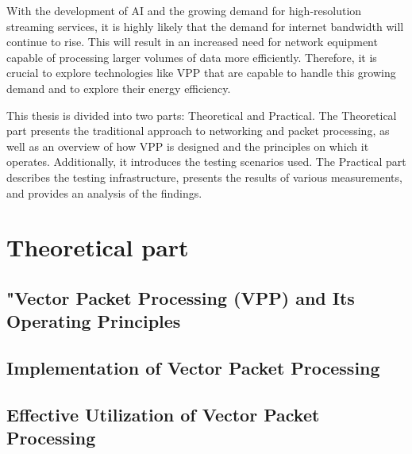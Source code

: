 With the development of AI and the growing demand for high-resolution streaming services, it is highly likely that the demand for internet bandwidth will continue to rise. 
This will result in an increased need for network equipment capable of processing larger volumes of data more efficiently. 
Therefore, it is crucial to explore technologies like VPP that are capable to handle this growing demand and to explore their energy efficiency.

This thesis is divided into two parts: Theoretical and Practical. 
The Theoretical part presents the traditional approach to networking and packet processing, as well as an overview of how VPP is designed and the principles on which it operates. Additionally, it introduces the testing scenarios used. 
The Practical part describes the testing infrastructure, presents the results of various measurements, and provides an analysis of the findings.

\chapter{Theoretical part}

\section{"Vector Packet Processing (VPP) and Its Operating Principles}


\section{Implementation of Vector Packet Processing}


\section{Effective Utilization of Vector Packet Processing}


